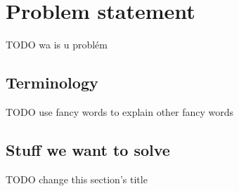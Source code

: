 
 \chapter{Problem statement}

  TODO wa is u problém

  \section{Terminology}

   TODO use fancy words to explain other fancy words

  \section{Stuff we want to solve}

   TODO change this section's title

